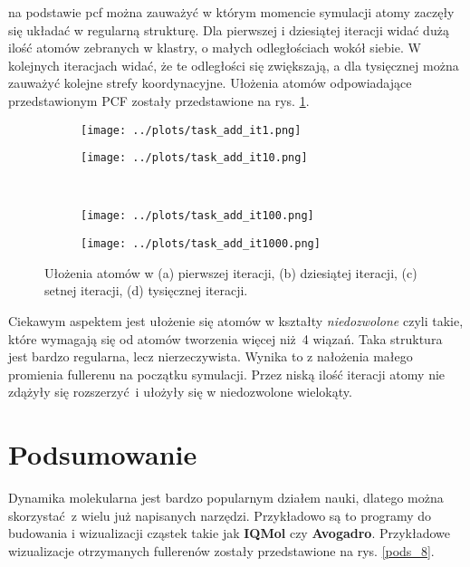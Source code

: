 \documentclass[a4paper,12pt]{article}
\begin{document}
	\noindent na podstawie pcf można zauważyć w którym momencie symulacji atomy zaczęły się układać w regularną strukturę.
	Dla pierwszej i dziesiątej iteracji widać dużą ilość atomów zebranych w klastry, o małych odległościach wokół siebie.
	W kolejnych iteracjach widać, że te odległości się zwiększają, a dla tysięcznej można zauważyć kolejne strefy koordynacyjne.
	Ułożenia atomów odpowiadające przedstawionym PCF zostały przedstawione na rys. \ref{optim_it}.
	\begin{figure}[H]
		\begin{subfigure}{0.49\textwidth}
			\centering
			\texttt{[image: ../plots/task\_add\_it1.png]}
			\caption{}
		\end{subfigure}
		\begin{subfigure}{0.49\textwidth}
			\centering
			\texttt{[image: ../plots/task\_add\_it10.png]}
			\caption{}
		\end{subfigure}
		\\
		\begin{subfigure}{0.49\textwidth}
			\centering
			\texttt{[image: ../plots/task\_add\_it100.png]}
			\caption{}
		\end{subfigure}
		\begin{subfigure}{0.49\textwidth}
			\centering
			\texttt{[image: ../plots/task\_add\_it1000.png]}
			\caption{}
		\end{subfigure}
		\caption{Ułożenia atomów w (a) pierwszej iteracji, (b) dziesiątej iteracji, (c) setnej iteracji, (d) tysięcznej iteracji.}
		\label{optim_it}
	\end{figure}
	
	\noindent Ciekawym aspektem jest ułożenie się atomów w kształty \textit{niedozwolone} czyli takie, które wymagają się od atomów tworzenia więcej niż 4 wiązań.
	Taka struktura jest bardzo regularna, lecz nierzeczywista. 
	Wynika to z nałożenia małego promienia fullerenu na początku symulacji.
	Przez niską ilość iteracji atomy nie zdążyły się rozszerzyć i ułożyły się w niedozwolone wielokąty.
	
	
	\newpage
	
	\section*{Podsumowanie}
	
	Dynamika molekularna jest bardzo popularnym działem nauki, dlatego można skorzystać z wielu już napisanych narzędzi.
	Przykładowo są to programy do budowania i wizualizacji cząstek takie jak \textbf{IQMol} czy \textbf{Avogadro}. 
	Przykładowe wizualizacje otrzymanych fullerenów zostały przedstawione na rys. \ref{pods_8}.
	
\end{document}
